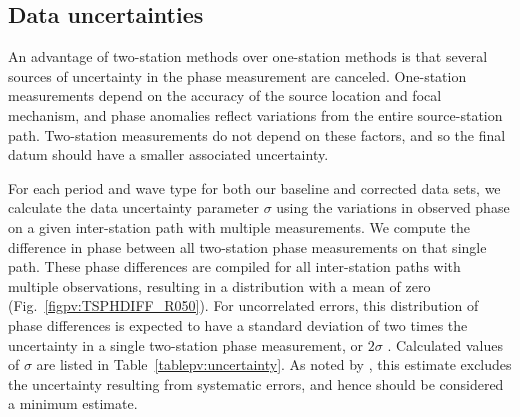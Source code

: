 \documentclass[12pt,oneside]{book}
\begin{document}
\subsection{Data uncertainties}\label{sec:datauncert}
An advantage of two-station methods over one-station methods is that several sources of uncertainty in the phase measurement are canceled. One-station measurements depend on the accuracy of the source location and focal mechanism, and phase anomalies reflect variations from the entire source-station path. Two-station measurements do not depend on these factors, and so the final datum should have a smaller associated uncertainty. 

For each period and wave type for both our baseline and corrected data sets, we calculate the data uncertainty parameter $\sigma$ using the variations in observed phase on a given inter-station path with multiple measurements. We compute the difference in phase between all two-station phase measurements on that single path.  These phase differences are compiled for all inter-station paths with multiple observations, resulting in a distribution with a mean of zero (Fig.~\ref{figpv:TSPHDIFF_R050}). For uncorrelated errors, this distribution of phase differences is expected to have a standard deviation of two times the uncertainty in a single two-station phase measurement, or $2\sigma$ \citep[e.g.,][]{Ekstrom1997}. Calculated values of $\sigma$ are listed in Table~\ref{tablepv:uncertainty}. As noted by \citet{Ekstrom1997}, this estimate excludes the uncertainty resulting from systematic errors, and hence should be considered a minimum estimate. 
\end{document}
